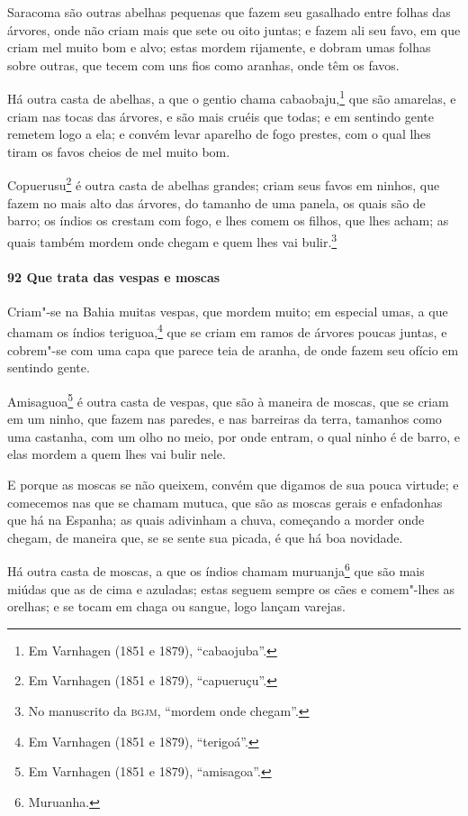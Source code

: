 \begin{linenumbers}
Saracoma são outras abelhas pequenas que fazem seu gasalhado entre folhas das árvores,
onde não criam mais que sete ou oito juntas; e fazem ali seu favo, em que criam mel muito
bom e alvo; estas mordem rijamente, e dobram umas folhas sobre outras, que tecem com uns
fios como aranhas, onde têm os favos.

Há outra casta de abelhas, a que o gentio chama cabaobaju,\footnote{ Em Varnhagen (1851 e
1879), ``cabaojuba''.} que são amarelas, e criam nas tocas das árvores, e são mais cruéis
que todas; e em sentindo gente remetem logo a ela; e convém levar aparelho de fogo
prestes, com o qual lhes tiram os favos cheios de mel muito bom.

Copuerusu\footnote{ Em Varnhagen (1851 e 1879), ``capueruçu''.} é outra casta de abelhas
grandes; criam seus favos em ninhos, que fazem no mais alto das árvores, do tamanho de uma
panela, os quais são de barro; os índios os crestam com fogo, e lhes comem os filhos, que
lhes acham; as quais também mordem onde chegam e quem lhes vai bulir.\footnote{ No
manuscrito da \textsc{bgjm}, ``mordem onde chegam''.}

\paragraph{92 Que trata das vespas e moscas}\quad
Criam"-se na Bahia muitas vespas, que mordem muito; em especial umas, a que chamam os
índios teriguoa,\footnote{ Em Varnhagen (1851 e 1879), ``terigoá''.} que se criam em ramos
de árvores poucas juntas, e cobrem"-se com uma capa que parece teia de aranha, de onde
fazem seu ofício em sentindo gente.

Amisaguoa\footnote{ Em Varnhagen (1851 e 1879), ``amisagoa''.} é outra casta de vespas,
que são à maneira de moscas, que se criam em um ninho, que fazem nas paredes, e nas
barreiras da terra, tamanhos como uma castanha, com um olho no meio, por onde entram, o
qual ninho é de barro, e elas mordem a quem lhes vai bulir nele.

E porque as moscas se não queixem, convém que digamos de sua pouca virtude; e comecemos
nas que se chamam mutuca, que são as moscas gerais e enfadonhas que há na Espanha; as
quais adivinham a chuva, começando a morder onde chegam, de maneira que, se se sente sua
picada, é que há boa novidade.

Há outra casta de moscas, a que os índios chamam muruanja\footnote{ Muruanha.} que são
mais miúdas que as de cima e azuladas; estas seguem sempre os cães e comem"-lhes as
orelhas; e se tocam em chaga ou sangue, logo lançam varejas.


\end{linenumbers}
